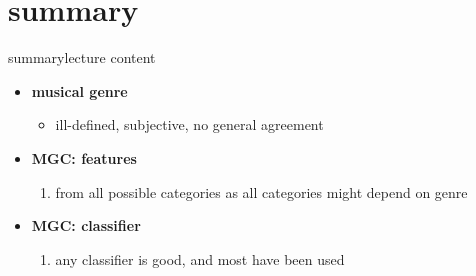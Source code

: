     \section{summary}
        \begin{frame}{summary}{lecture content}
            \begin{itemize}
                \item   \textbf{musical genre}
                    \begin{itemize}
                        \item   ill-defined, subjective, no general agreement
                    \end{itemize}
                \bigskip
                \item   \textbf{MGC: features}
                    \begin{enumerate}
                        \item   from all possible categories as all categories might depend on genre
                    \end{enumerate}
                \bigskip
                \item   \textbf{MGC: classifier}
                    \begin{enumerate}
                        \item   any classifier is good, and most have been used
                    \end{enumerate}
            \end{itemize}
        \end{frame}

